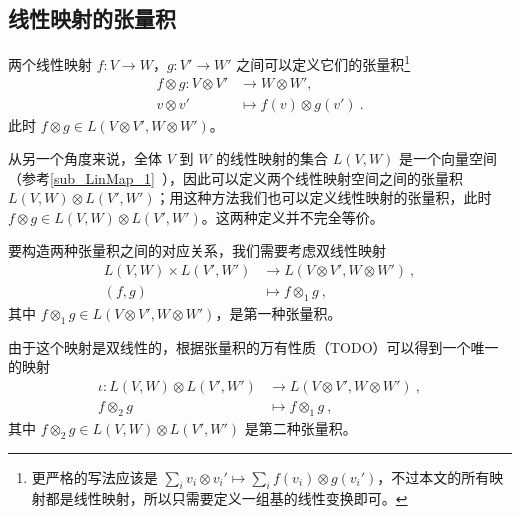 
\begin{issues}
\issueDraft
{}
\end{issues}


\subsection{线性映射的张量积}

两个线性映射 $f: V \to W$，$g: V' \to W'$ 之间可以定义它们的张量积\footnote{更严格的写法应该是 $\sum_i v_i \otimes v_i' \mapsto \sum_i f(v_i) \otimes g(v_i')$，不过本文的所有映射都是线性映射，所以只需要定义一组基的线性变换即可。}
\begin{equation}
\begin{aligned}
f \otimes g: V \otimes V' &\to W \otimes W', \\
v \otimes v' &\mapsto f(v) \otimes g(v')~.
\end{aligned}
\end{equation}
此时 $f \otimes g \in L(V \otimes V', W \otimes W')$。

从另一个角度来说，全体 $V$ 到 $W$ 的线性映射的集合 $L(V, W)$ 是一个向量空间（参考\autoref{sub_LinMap_1}~），因此可以定义两个线性映射空间之间的张量积 $L(V, W) \otimes L(V', W')$；用这种方法我们也可以定义线性映射的张量积，此时 $f \otimes g \in L(V, W) \otimes L(V', W')$。这两种定义并不完全等价。


要构造两种张量积之间的对应关系，我们需要考虑双线性映射
\begin{equation}
\begin{aligned}
L(V, W) \times L(V', W') &\to L(V \otimes V', W \otimes W')~, \\
(f, g) &\mapsto f \otimes_1 g~,
\end{aligned}
\end{equation}
其中 $f \otimes_1 g \in L(V \otimes V', W \otimes W')$，是第一种张量积。


由于这个映射是双线性的，根据张量积的万有性质（TODO）可以得到一个唯一的映射
\begin{equation}
\begin{aligned}
\iota: L(V, W) \otimes L(V', W') &\to L(V \otimes V', W \otimes W')~, \\
f \otimes_2 g &\mapsto f \otimes_1 g~,
\end{aligned}
\end{equation}
其中 $f \otimes_2 g \in L(V, W) \otimes L(V', W')$ 是第二种张量积。

